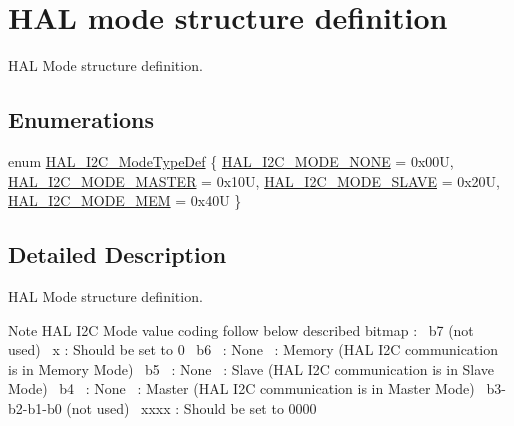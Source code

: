 \hypertarget{group___h_a_l__mode__structure__definition}{}\section{H\+AL mode structure definition}
\label{group___h_a_l__mode__structure__definition}


H\+AL Mode structure definition.  


\subsection*{Enumerations}
\begin{DoxyCompactItemize}
\item 
enum \hyperlink{group___h_a_l__mode__structure__definition_gabcbb7b844f2ffd63c4e530c117882062}{H\+A\+L\+\_\+\+I2\+C\+\_\+\+Mode\+Type\+Def} \{ \hyperlink{group___h_a_l__mode__structure__definition_ggabcbb7b844f2ffd63c4e530c117882062a98c8fd642b7ac45a23479bd597fc7a71}{H\+A\+L\+\_\+\+I2\+C\+\_\+\+M\+O\+D\+E\+\_\+\+N\+O\+NE} = 0x00U, 
\hyperlink{group___h_a_l__mode__structure__definition_ggabcbb7b844f2ffd63c4e530c117882062a1eea98660a170dd7b191c9dfe46da6d2}{H\+A\+L\+\_\+\+I2\+C\+\_\+\+M\+O\+D\+E\+\_\+\+M\+A\+S\+T\+ER} = 0x10U, 
\hyperlink{group___h_a_l__mode__structure__definition_ggabcbb7b844f2ffd63c4e530c117882062a817358d19d278261f2047a5ec8ec6b53}{H\+A\+L\+\_\+\+I2\+C\+\_\+\+M\+O\+D\+E\+\_\+\+S\+L\+A\+VE} = 0x20U, 
\hyperlink{group___h_a_l__mode__structure__definition_ggabcbb7b844f2ffd63c4e530c117882062a3f592bd942f973242aac6b7df79f3f1e}{H\+A\+L\+\_\+\+I2\+C\+\_\+\+M\+O\+D\+E\+\_\+\+M\+EM} = 0x40U
 \}
\end{DoxyCompactItemize}


\subsection{Detailed Description}
H\+AL Mode structure definition. 

\begin{DoxyNote}{Note}
H\+AL I2C Mode value coding follow below described bitmap \+:~\newline
 b7 (not used)~\newline
 x \+: Should be set to 0~\newline
 b6~ \+: None~ \+: Memory (H\+AL I2C communication is in Memory Mode)~\newline
 b5~ \+: None~ \+: Slave (H\+AL I2C communication is in Slave Mode)~\newline
 b4~ \+: None~ \+: Master (H\+AL I2C communication is in Master Mode)~\newline
 b3-\/b2-\/b1-\/b0 (not used)~\newline
 xxxx \+: Should be set to 0000 
\end{DoxyNote}


